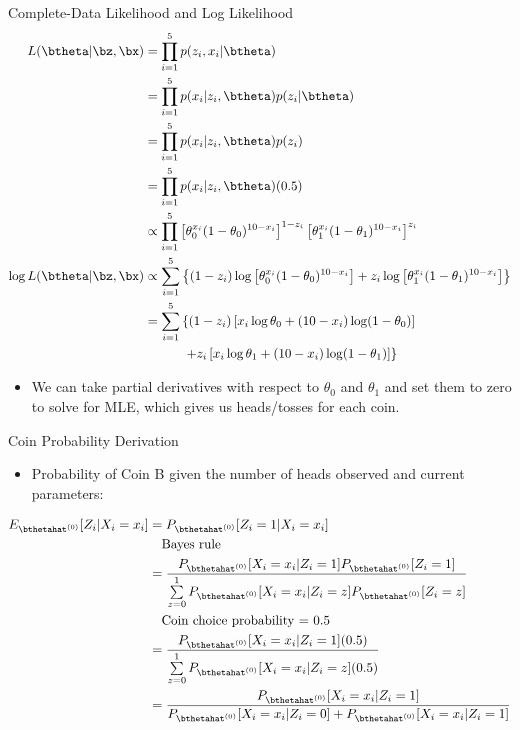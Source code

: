 \documentclass[dvipdfmx,bigger,aspectratio=169]{beamer}
\begin{document}
\begin{frame}[allowframebreaks,label=,t]{Complete-Data Likelihood and Log Likelihood}
\begin{align*}
\label{eq:org9bf4fac}
  L(\btheta | \bz,\bx)
  &= \prod^{5}_{i=1} p(z_{i},x_{i} | \btheta)\\
  &= \prod^{5}_{i=1} p(x_{i} | z_{i}, \btheta) p(z_{i} | \btheta)\\
  &= \prod^{5}_{i=1} p(x_{i} | z_{i}, \btheta) p(z_{i})\\
  &= \prod^{5}_{i=1} p(x_{i} | z_{i}, \btheta) (0.5)\\
  &\propto \prod^{5}_{i=1}
    \left[ \theta_{0}^{x_{i}}(1-\theta_{0})^{10-x_{i}} \right]^{1-z_{i}}
    \left[ \theta_{1}^{x_{i}}(1-\theta_{1})^{10-x_{i}} \right]^{z_{i}}\\
  \log L(\btheta | \bz,\bx)
  &\propto \sum^{5}_{i=1}
    \left\{
    (1-z_{i}) \log \left[ \theta_{0}^{x_{i}}(1-\theta_{0})^{10-x_{i}} \right] +
    z_{i} \log \left[ \theta_{1}^{x_{i}}(1-\theta_{1})^{10-x_{i}} \right]
    \right\}\\
  &= \sum^{5}_{i=1}
    \left\{
    (1-z_{i}) \left[ x_{i}\log\theta_{0} + (10-x_{i})\log(1-\theta_{0})\right]
    \right.\\
  &~~~~~~~~~ \left.
    + z_{i} \left[ x_{i}\log\theta_{1} + (10-x_{i})\log(1-\theta_{1})\right]
    \right\}
\end{align*}
\begin{itemize}
\item We can take partial derivatives with respect to \(\theta_{0}\) and \(\theta_{1}\) and set them to zero to solve for MLE, which gives us heads/tosses for each coin.
\end{itemize}
\end{frame}

\begin{frame}[label={sec:orgea6feb1}]{Coin Probability Derivation}
\begin{itemize}
\item Probability of Coin B given the number of heads observed and current parameters:
\end{itemize}
\footnotesize
\begin{align*}
  E_{\bthetahat^{(0)}}[Z_{i} | X_{i} = x_{i}] &= P_{\bthetahat^{(0)}}[Z_{i} = 1 | X_{i} = x_{i}]\\
  &~~~\text{Bayes rule}\\
  &= \frac{P_{\bthetahat^{(0)}}[X_{i} = x_{i} | Z_{i} = 1] P_{\bthetahat^{(0)}}[Z_{i} = 1]}
          {\sum\limits^{1}_{z=0} P_{\bthetahat^{(0)}}[X_{i} = x_{i} | Z_{i} = z] P_{\bthetahat^{(0)}}[Z_{i} = z]}\\
  &~~~\text{Coin choice probability = 0.5}\\
  &= \frac{P_{\bthetahat^{(0)}}[X_{i} = x_{i} | Z_{i} = 1] (0.5)}
          {\sum\limits^{1}_{z=0} P_{\bthetahat^{(0)}}[X_{i} = x_{i} | Z_{i} = z] (0.5)}\\
  &= \frac{P_{\bthetahat^{(0)}}[X_{i} = x_{i} | Z_{i} = 1]}
          {P_{\bthetahat^{(0)}}[X_{i} = x_{i} | Z_{i} = 0] + P_{\bthetahat^{(0)}}[X_{i} = x_{i} | Z_{i} = 1]}
\end{align*}
\normalsize
\end{frame}
\end{document}
